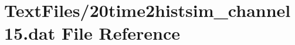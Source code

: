 \hypertarget{20time2histsim__channel15_8dat}{}\section{Text\+Files/20time2histsim\+\_\+channel15.dat File Reference}
\label{20time2histsim__channel15_8dat}
